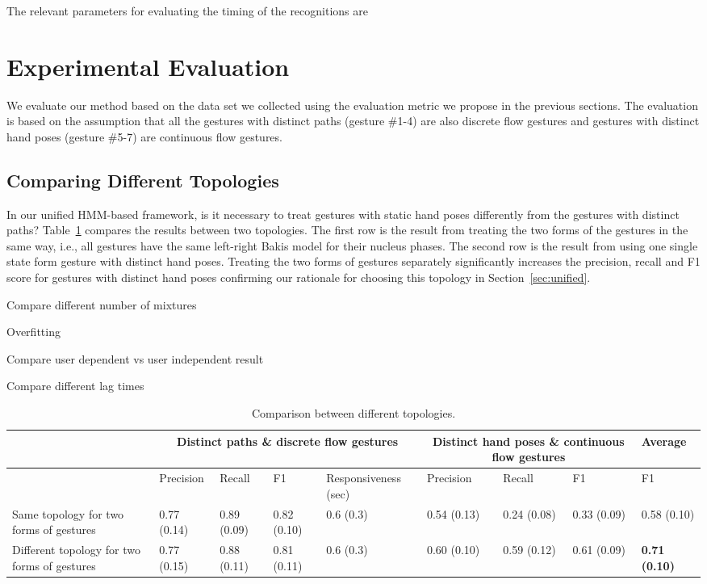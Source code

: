 \documentclass[conference]{IEEEtran}
\begin{document}
The relevant parameters for evaluating the timing of the recognitions are

\section{Experimental Evaluation}
We evaluate our method based on the data set we collected using the
evaluation metric we propose in the previous sections. The evaluation is based
on the assumption that all the gestures with distinct paths (gesture \#1-4)
are also discrete flow gestures and gestures with distinct hand poses (gesture
\#5-7) are continuous flow gestures. 

\subsection{Comparing Different Topologies}
In our unified HMM-based framework, is it necessary to treat gestures with
static hand poses differently from the gestures with distinct paths?
Table~\ref{tab:result} compares the results between two topologies. The first
row is the result from treating the two forms of the gestures in the same way,
i.e., all gestures have the same left-right Bakis model for their nucleus
phases. The second row is the result from using one single state form gesture
with distinct hand poses. Treating the two forms of gestures separately
significantly increases the precision, recall and F1 score for gestures with
distinct hand poses confirming our rationale for choosing this topology in
Section~\ref{sec:unified}.

Compare different number of mixtures

Overfitting

Compare user dependent vs user independent result

Compare different lag times

\begin{table}[t]
\caption{Comparison between different topologies.}
\label{tab:result}
\centering
\begin{tabular}{|l|l|l|l|l|l|l|l|l|}
\hline
& \multicolumn{4}{|c|}{Distinct paths \& discrete flow gestures} &
\multicolumn{3}{|c|}{Distinct hand poses \& continuous flow gestures} &
Average\\
\hline
& Precision & Recall & F1 & Responsiveness (sec) & Precision & Recall & F1 &
F1\\
\hline
Same topology for two forms of gestures & 0.77 (0.14) & 0.89 (0.09) & 0.82
(0.10) & 0.6 (0.3) & 0.54 (0.13) & 0.24 (0.08) & 0.33 (0.09) & 0.58 (0.10)
\\
\hline
Different topology for two forms of gestures & 0.77 (0.15) & 0.88 (0.11) &
0.81 (0.11) & 0.6 (0.3) & 0.60 (0.10) & 0.59 (0.12) & 0.61 (0.09) & \textbf{0.71
(0.10)}\\
\hline
\end{tabular}
\end{table}
\end{document}
